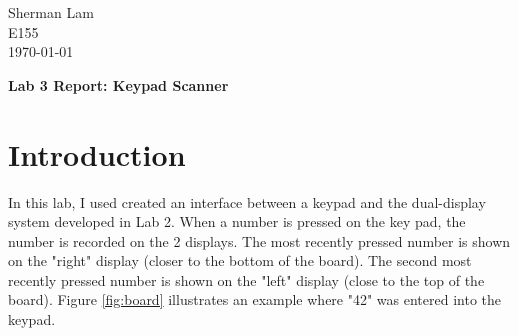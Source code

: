 \documentclass[11pt]{article}
\begin{document}
\begin{flushleft}
Sherman Lam
\\E155
\\ \today
\end{flushleft}


\begin{center}
\begin{Large}
\textbf{Lab 3 Report: Keypad Scanner}
\end{Large}
\end{center}




\section{Introduction}
\label{sec:intro}

In this lab, I used created an interface between a keypad and the dual-display system developed in Lab 2. When a number is pressed on the key pad, the number is recorded on the 2 displays. The most recently pressed number is shown on the "right" display (closer to the bottom of the board). The second most recently pressed number is shown on the "left" display (close to the top of the board). Figure \ref{fig:board} illustrates an example where "42" was entered into the keypad.
\end{document}
